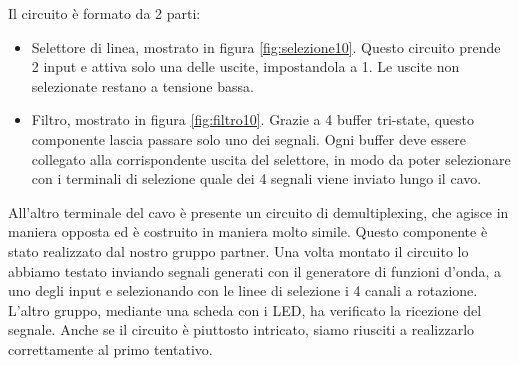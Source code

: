 Il circuito è formato da 2 parti:

\begin{itemize}
    \item{Selettore di linea, mostrato in figura \ref{fig:selezione10}. Questo circuito prende 2 input e
        attiva solo una delle uscite, impostandola a 1. Le uscite non selezionate restano a tensione bassa.}
    \item{Filtro, mostrato in figura \ref{fig:filtro10}. Grazie a 4 buffer tri-state, questo componente lascia
        passare solo uno dei segnali. Ogni buffer deve essere collegato alla corrispondente uscita del selettore,
        in modo da poter selezionare con i terminali di selezione quale dei 4 segnali viene inviato lungo il cavo.}
\end{itemize}

All'altro terminale del cavo è presente un circuito di demultiplexing, che agisce in maniera opposta ed è costruito in
maniera molto simile. Questo componente è stato realizzato dal nostro gruppo partner. Una volta montato il circuito
lo abbiamo testato inviando segnali generati con il generatore di funzioni d'onda, a uno degli input e selezionando
con le linee di selezione i 4 canali a rotazione. L'altro gruppo, mediante una scheda con i LED, ha verificato
la ricezione del segnale. Anche se il circuito è piuttosto intricato, siamo riusciti a realizzarlo
correttamente al primo tentativo.
